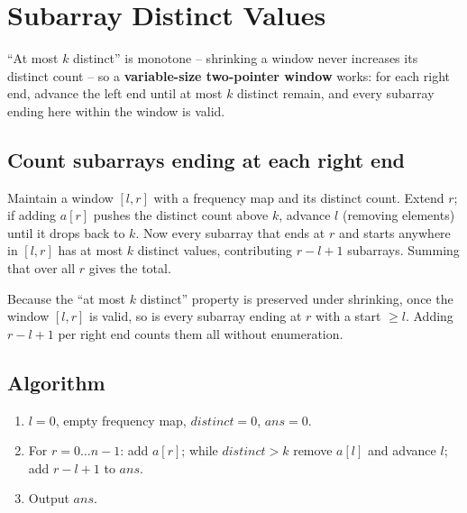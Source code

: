 \section{Subarray Distinct Values}
\label{sec:cses-subarray-distinct}


\begin{patternbox}
``At most $k$ distinct'' is monotone -- shrinking a window never increases
its distinct count -- so a \textbf{variable-size two-pointer window} works:
for each right end, advance the left end until at most $k$ distinct remain,
and every subarray ending here within the window is valid.
\end{patternbox}

\subsection*{Count subarrays ending at each right end}

Maintain a window $[l,r]$ with a frequency map and its distinct count.
Extend $r$; if adding $a[r]$ pushes the distinct count above $k$, advance
$l$ (removing elements) until it drops back to $k$. Now every subarray that
ends at $r$ and starts anywhere in $[l,r]$ has at most $k$ distinct values,
contributing $r-l+1$ subarrays. Summing that over all $r$ gives the total.

\begin{ideabox}
Because the ``at most $k$ distinct'' property is preserved under shrinking,
once the window $[l,r]$ is valid, so is every subarray ending at $r$ with a
start $\ge l$. Adding $r-l+1$ per right end counts them all without
enumeration.
\end{ideabox}

\subsection*{Algorithm}

\begin{enumerate}
  \item $l=0$, empty frequency map, $\textit{distinct}=0$,
        $\textit{ans}=0$.
  \item For $r=0\ldots n-1$: add $a[r]$; while $\textit{distinct}>k$
        remove $a[l]$ and advance $l$; add $r-l+1$ to $\textit{ans}$.
  \item Output $\textit{ans}$.
\end{enumerate}

